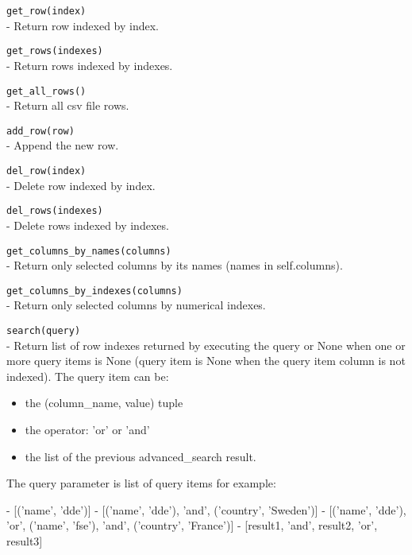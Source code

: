 \documentclass[a4paper]{book}
\begin{document}
\begin{api}
  {\tt get\_row(index)}\\
  - Return row indexed by index.

  {\tt get\_rows(indexes)}\\
  - Return rows indexed by indexes.

  {\tt get\_all\_rows()}\\
  - Return all csv file rows.

  {\tt add\_row(row)}\\
  - Append the new row.

  {\tt del\_row(index)}\\
  - Delete row indexed by index.

  {\tt del\_rows(indexes)}\\
  - Delete rows indexed by indexes.

  {\tt get\_columns\_by\_names(columns)}\\
  - Return only selected columns by its names (names in self.columns).

  {\tt get\_columns\_by\_indexes(columns)}\\
  - Return only selected columns by numerical indexes.

  {\tt search(query)}\\
  - Return list of row indexes returned by executing the query
    or None when one or more query items is None (query item
    is None when the query item column is not indexed).
    The query item can be: 
    \begin{itemize}
        \item the (column\_name, value) tuple 
        \item the operator:  'or' or 'and'
        \item the list of the previous advanced\_search result.
    \end{itemize}
    
    The query parameter is list of query items for example:
    \begin{code}
    - [('name', 'dde')]
    - [('name', 'dde'), 'and', ('country', 'Sweden')]
    - [('name', 'dde'), 'or', ('name', 'fse'), 
       'and', ('country', 'France')]
    - [result1, 'and', result2, 'or', result3]
    \end{code}
\end{api}
\end{document}
